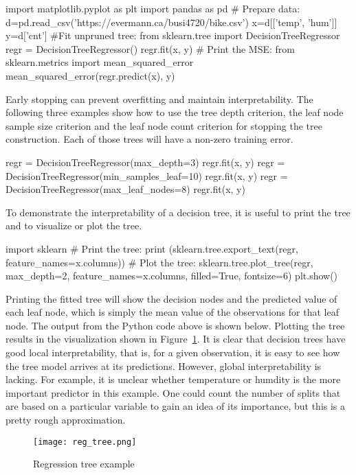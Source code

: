 \begin{pythoncode}
import matplotlib.pyplot as plt
import pandas as pd
# Prepare data:
d=pd.read_csv('https://evermann.ca/busi4720/bike.csv')
x=d[['temp', 'hum']]
y=d['cnt']
#Fit unpruned tree:
from sklearn.tree import DecisionTreeRegressor
regr = DecisionTreeRegressor()
regr.fit(x, y)
# Print the MSE:
from sklearn.metrics import mean_squared_error
mean_squared_error(regr.predict(x), y)
\end{pythoncode}

Early stopping can prevent overfitting and maintain interpretability. The following three examples show how to use the tree depth criterion, the leaf node sample size criterion and the leaf node count criterion for stopping the tree construction. Each of those trees will have a non-zero training error.

\begin{pythoncode}
regr = DecisionTreeRegressor(max_depth=3)
regr.fit(x, y)
regr = DecisionTreeRegressor(min_samples_leaf=10)
regr.fit(x, y)
regr = DecisionTreeRegressor(max_leaf_nodes=8)
regr.fit(x, y)
\end{pythoncode}

To demonstrate the interpretability of a decision tree, it is useful to print the tree and to visualize or plot the tree. 

\begin{pythoncode}
import sklearn
# Print the tree:
print (sklearn.tree.export_text(regr, feature_names=x.columns))
# Plot the tree:
sklearn.tree.plot_tree(regr, max_depth=2, feature_names=x.columns, 
    filled=True, fontsize=6)
plt.show()
\end{pythoncode}

Printing the fitted tree will show the decision nodes and the predicted value of each leaf node, which is simply the mean value of the observations for that leaf node. The output from the Python code above is shown below. Plotting the tree results in the visualization shown in Figure~\ref{fig:regtree}. It is clear that decision trees have good local interpretability, that is, for a given observation, it is easy to see how the tree model arrives at its predictions. However, global interpretability is lacking. For example, it is unclear whether temperature or humdity is the more important predictor in this example. One could count the number of splits that are based on a particular variable to gain an idea of its importance, but this is a pretty rough approximation. 

\begin{figure}
\centering

\texttt{[image: reg\_tree.png]}
\caption{Regression tree example}
\label{fig:regtree}
\end{figure}

